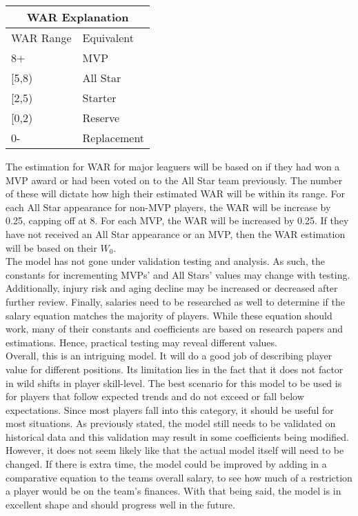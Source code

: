\documentclass[12pt]{article}
\newcommand\tab[1][1cm]{\hspace*{#1}}
\begin{document}
\begin{center}
\begin{tabular}{ |p{2.3cm}||p{5cm}|  }
\hline
\multicolumn{2}{|c|}{WAR Explanation} \\
\hline
WAR Range  & Equivalent \\
\hline
8+  & MVP  \\
\hline
[5,8) &   All Star\\
\hline
[2,5) & Starter \\
\hline
[0,2)  & Reserve \\
\hline
0- & Replacement \\
 \hline
\end{tabular}
\end{center}
The estimation for WAR for major leaguers will be based on if they had won a MVP award or had been voted on to the All Star team previously.  The number of these will dictate how high their estimated WAR will be within its range. For each All Star appearance for non-MVP players, the WAR will be increase by 0.25, capping off at 8.  For each MVP, the WAR will be increased by 0.25.   If they have not received an All Star appearance or an MVP, then the WAR estimation will be based on their $W_0$. \\ 
	\tab The model has not gone under validation testing and analysis.  As such, the constants for incrementing MVPs' and All Stars' values may change with testing.  Additionally, injury risk and aging decline may be increased or decreased after further review.  Finally, salaries need to be researched as well to determine if the salary equation matches the majority of players.  While these equation should work, many of their constants and coefficients are based on research papers and estimations.  Hence, practical testing may reveal different values. \\
	\tab Overall, this is an intriguing model.  It will do a good job of describing player value for different positions.  Its limitation lies in the fact that it does not factor in wild shifts in player skill-level.  The best scenario for this model to be used is for players that follow expected trends and do not exceed or fall below expectations.  Since most players fall into this category, it should be useful for most situations.  As previously stated, the model still needs to be validated on historical data and this validation may result in some coefficients being modified.  However, it does not seem likely like that the actual model itself will need to be changed.  If there is extra time, the model could be improved by adding in a comparative equation to the teams overall salary, to see how much of a restriction a player would be on the team's finances.  With that being said, the model is in excellent shape and should progress well in the future.   \\
\pagebreak
\end{document}
